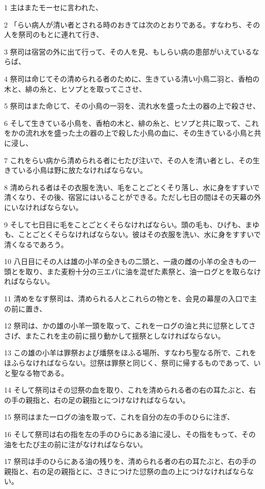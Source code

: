 \par 1 主はまたモーセに言われた、
\par 2 「らい病人が清い者とされる時のおきては次のとおりである。すなわち、その人を祭司のもとに連れて行き、
\par 3 祭司は宿営の外に出て行って、その人を見、もしらい病の患部がいえているならば、
\par 4 祭司は命じてその清められる者のために、生きている清い小鳥二羽と、香柏の木と、緋の糸と、ヒソプとを取ってこさせ、
\par 5 祭司はまた命じて、その小鳥の一羽を、流れ水を盛った土の器の上で殺させ、
\par 6 そして生きている小鳥を、香柏の木と、緋の糸と、ヒソプと共に取って、これをかの流れ水を盛った土の器の上で殺した小鳥の血に、その生きている小鳥と共に浸し、
\par 7 これをらい病から清められる者に七たび注いで、その人を清い者とし、その生きている小鳥は野に放たなければならない。
\par 8 清められる者はその衣服を洗い、毛をことごとくそり落し、水に身をすすいで清くなり、その後、宿営にはいることができる。ただし七日の間はその天幕の外にいなければならない。
\par 9 そして七日目に毛をことごとくそらなければならい。頭の毛も、ひげも、まゆも、ことごとくそらなければならない。彼はその衣服を洗い、水に身をすすいで清くなるであろう。
\par 10 八日目にその人は雄の小羊の全きもの二頭と、一歳の雌の小羊の全きもの一頭とを取り、また麦粉十分の三エパに油を混ぜた素祭と、油一ログとを取らなければならない。
\par 11 清めをなす祭司は、清められる人とこれらの物とを、会見の幕屋の入口で主の前に置き、
\par 12 祭司は、かの雄の小羊一頭を取って、これを一ログの油と共に愆祭としてささげ、またこれを主の前に揺り動かして揺祭としなければならない。
\par 13 この雄の小羊は罪祭および燔祭をほふる場所、すなわち聖なる所で、これをほふらなければならない。愆祭は罪祭と同じく、祭司に帰するものであって、いと聖なる物である。
\par 14 そして祭司はその愆祭の血を取り、これを清められる者の右の耳たぶと、右の手の親指と、右の足の親指とにつけなければならない。
\par 15 祭司はまた一ログの油を取って、これを自分の左の手のひらに注ぎ、
\par 16 そして祭司は右の指を左の手のひらにある油に浸し、その指をもって、その油を七たび主の前に注がなければならない。
\par 17 祭司は手のひらにある油の残りを、清められる者の右の耳たぶと、右の手の親指と、右の足の親指とに、さきにつけた愆祭の血の上につけなければならない。

